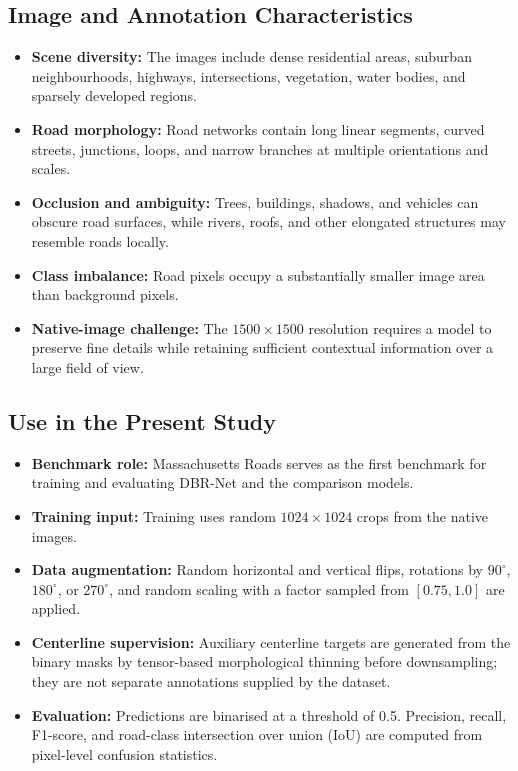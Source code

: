 \documentclass[11pt,a4paper]{article}
\begin{document}
\subsection{Image and Annotation Characteristics}

\begin{itemize}
  \item \textbf{Scene diversity:} The images include dense residential areas,
        suburban neighbourhoods, highways, intersections, vegetation, water
        bodies, and sparsely developed regions.
  \item \textbf{Road morphology:} Road networks contain long linear segments,
        curved streets, junctions, loops, and narrow branches at multiple
        orientations and scales.
  \item \textbf{Occlusion and ambiguity:} Trees, buildings, shadows, and vehicles
        can obscure road surfaces, while rivers, roofs, and other elongated
        structures may resemble roads locally.
  \item \textbf{Class imbalance:} Road pixels occupy a substantially smaller
        image area than background pixels.
  \item \textbf{Native-image challenge:} The $1500\times1500$ resolution requires
        a model to preserve fine details while retaining sufficient contextual
        information over a large field of view.
\end{itemize}

\subsection{Use in the Present Study}

\begin{itemize}
  \item \textbf{Benchmark role:} Massachusetts Roads serves as the first
        benchmark for training and evaluating DBR-Net and the comparison models.
  \item \textbf{Training input:} Training uses random $1024\times1024$ crops from
        the native images.
  \item \textbf{Data augmentation:} Random horizontal and vertical flips,
        rotations by $90^{\circ}$, $180^{\circ}$, or $270^{\circ}$, and random
        scaling with a factor sampled from $[0.75,1.0]$ are applied.
  \item \textbf{Centerline supervision:} Auxiliary centerline targets are
        generated from the binary masks by tensor-based morphological thinning
        before downsampling; they are not separate annotations supplied by the
        dataset.
  \item \textbf{Evaluation:} Predictions are binarised at a threshold of 0.5.
        Precision, recall, F1-score, and road-class intersection over union (IoU)
        are computed from pixel-level confusion statistics.
\end{itemize}
\end{document}
